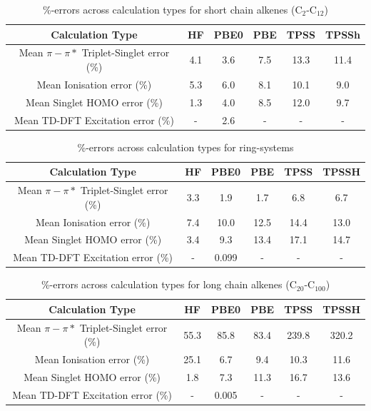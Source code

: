 \documentclass[12pt]{article}
\begin{document}
\newpage

\begin{table}[h]
\begin{tabular}{c c c c c c }
\hline
Calculation Type & HF & PBE0 & PBE & TPSS & TPSSh \\
\hline
Mean \(\pi - \pi*\) Triplet-Singlet error (\%) & 4.1 & 3.6 & 7.5 & 13.3 & 11.4 \\
Mean Ionisation error (\%) & 5.3 & 6.0 & 8.1 & 10.1 & 9.0 \\
Mean Singlet HOMO error (\%) & 1.3 & 4.0 & 8.5 & 12.0 & 9.7 \\
Mean TD-DFT Excitation error (\%) & - & 2.6 & - & - & - \\ 
\hline
\end{tabular}
\caption{\%-errors across calculation types for short chain alkenes  (C\(_{2}\)-C\(_{12}\))}
\label{table:alkene_errors}
\end{table}

\newpage

\begin{table}[h]
\begin{tabular}{c c c c c c }
\hline
Calculation Type & HF & PBE0 & PBE & TPSS & TPSSH \\
\hline
Mean \(\pi - \pi*\) Triplet-Singlet error (\%) & 3.3 & 1.9 & 1.7 & 6.8 & 6.7 \\
Mean Ionisation error (\%) & 7.4 & 10.0 & 12.5 & 14.4 & 13.0 \\
Mean Singlet HOMO error (\%) & 3.4  & 9.3  & 13.4 & 17.1 & 14.7 \\
Mean TD-DFT Excitation error (\%) & - & 0.099 & - & - & - \\ 
\hline
\end{tabular}
\caption{\%-errors across calculation types for ring-systems}
\label{table:ring_system_errors}
\end{table}

\newpage

\begin{table}[h]
\begin{tabular}{c c c c c c }
\hline
Calculation Type & HF & PBE0 & PBE & TPSS & TPSSH \\
\hline
Mean \(\pi - \pi*\) Triplet-Singlet error (\%) & 55.3 & 85.8 & 83.4 & 239.8 & 320.2 \\
Mean Ionisation error (\%) & 25.1 & 6.7 & 9.4 & 10.3 & 11.6 \\
Mean Singlet HOMO error (\%) & 1.8 & 7.3 & 11.3 & 16.7 & 13.6 \\
Mean TD-DFT Excitation error (\%) & - & 0.005 & - & - & - \\ 
\hline
\end{tabular}
\caption{\%-errors across calculation types for long chain alkenes (C\(_{20}\)-C\(_{100}\))}
\label{table:long_alkene_errors}
\end{table}
\end{document}
